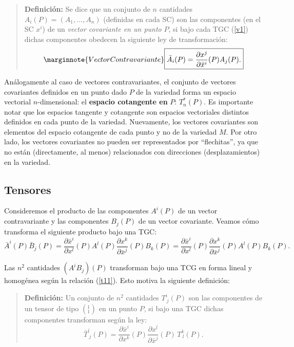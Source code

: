 \begin{quotation}
\textbf{Definición:} Se dice que un conjunto de $n$ cantidades $A_i(P)=(A_1,\dots
,A_n)$ (definidas en cada SC) son las componentes (en el SC $x^i$) de un \textit{vector covariante en un punto} $P$, si bajo cada TGC (\ref{v1}) dichas componentes obedecen la siguiente ley de transformación:
\begin{equation}\marginnote{Vector Contravariante}
\boxed{\bar{A}_i(P)=\frac{\partial x^j}{\partial\bar{x}^i}(P)A_j(P).}
\label{t6}
\end{equation}
\end{quotation}

Análogamente al caso de vectores contravariantes, el conjunto de vectores
covariantes definidos en un punto dado $P$ de la variedad forma un espacio
vectorial $n$-dimensional: el \textbf{espacio cotangente en} $P$: $T_n^*(P)$. Es
importante notar que los espacios tangente y cotangente son espacios
vectoriales distintos definidos en cada punto de la variedad. Nuevamente, los
vectores covariantes son elementos del espacio cotangente de cada punto y no de la variedad $M$. Por otro lado, los vectores covariantes no pueden ser representados por ``flechitas'', ya que no están (directamente, al menos) relacionados con direcciones (desplazamientos) en la variedad.


\subsection{Tensores}
Consideremos el producto de las componentes $A^i (P)$ de un vector
contravariante y las componentes $B_j(P)$ de un vector covariante. Veamos
cómo transforma el siguiente producto bajo una TGC:
\begin{equation}
\bar{A}^i (P)\bar{B}_j (P)=\frac{\partial\bar{x}^i}{\partial x^l}(P)A^l (P)
\frac{\partial x^k}{\partial\bar{x}^j}(P)B_k(P)=\frac{\partial\bar{x}^i 
}{\partial x^l}(P)\frac{\partial x^k}{\partial\bar{x}^j}(P)A^l (P)B_k(P).
\label{t11}
\end{equation}

Las $n^2$ cantidades $(A^i B_j)(P)$ transforman bajo una TCG en forma lineal y homogénea según la relación (\ref{t11}). Esto motiva la siguiente definición:
\begin{quotation}
\textbf{Definición:} Un conjunto de $n^2$ cantidades $T_{\ j}^i (P)$ son las
componentes de un tensor de tipo $(^1_1)$ en un punto $P$, si bajo una TGC
dichas componentes transforman según la ley:
\begin{equation}
\boxed{\bar{T}_{\ j}^i (P)=\frac{\partial\bar{x}^i}{\partial
x^k}(P)\frac{\partial x^l}{\partial\bar{x}^j}(P)\,T_{\ l}^k(P).} \label{t12}
\end{equation}
\end{quotation}

